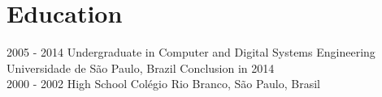\documentclass[]{friggeri-cv}
\begin{document}
\section{Education}
\begin{entrylist}
  \entry
    {2005 - 2014}
    {Undergraduate in Computer and Digital Systems Engineering\\}
    {Universidade de São Paulo, Brazil}
    {Conclusion in 2014\\
    }
  \entry
    {2000 - 2002}
    {High School}
    {Colégio Rio Branco, São Paulo, Brasil}
    {%
    }
\end{entrylist}


\newpage
\end{document}
